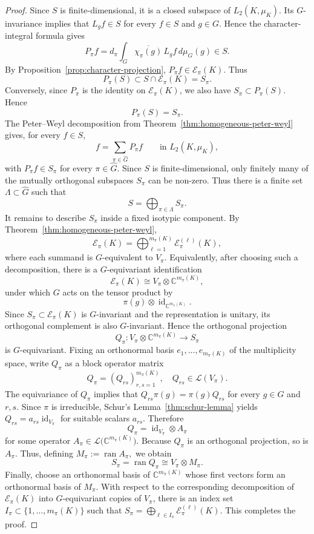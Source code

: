 \documentclass[11pt,showkeys]{amsart}
\begin{document}
\begin{proof}
Since \(S\) is finite-dimensional, it is a closed subspace of
\(L_2(K,\mu_K)\). Its \(G\)-invariance implies that
\(L_gf\in S\) for every \(f\in S\) and \(g\in G\). Hence the
character-integral formula gives
\[
        P_\pi f
        =
        d_\pi
        \int_G
        \overline{\chi_\pi(g)}\,L_g f\,d\mu_G(g)
        \in S .
\]
By Proposition~\ref{prop:character-projection}, \(P_\pi f\in
\mathcal E_\pi(K)\). Thus
\[
        P_\pi(S)\subset S\cap\mathcal E_\pi(K)=S_\pi .
\]
Conversely, since \(P_\pi\) is the identity on \(\mathcal E_\pi(K)\), we
also have \(S_\pi\subset P_\pi(S)\). Hence
\[
        P_\pi(S)=S_\pi .
\]
The Peter--Weyl decomposition  from Theorem~\ref{thm:homogeneous-peter-weyl} gives, for every \(f\in S\),
\[
    f=\sum_{\pi\in\widehat G}P_\pi f
    \qquad\text{in }L_2(K,\mu_K),
\]
with \(P_\pi f\in S_\pi\) for every \(\pi\in\widehat G\). Since \(S\)
is finite-dimensional, only finitely many of the mutually orthogonal
subspaces \(S_\pi\) can be non-zero.
Thus there is a finite set
\(\Lambda\subset\widehat G\) such that
\[
        S=
        \bigoplus_{\pi\in\Lambda}S_\pi .
\]
It remains to describe \(S_\pi\) inside a fixed isotypic component.
By Theorem~\ref{thm:homogeneous-peter-weyl},
\[
    \mathcal E_\pi(K)
    =
    \bigoplus_{\ell=1}^{m_\pi(K)}
    \mathcal E_\pi^{(\ell)}(K),
\]
where each summand is \(G\)-equivalent to \(V_\pi\). Equivalently,
after choosing such a decomposition, there is a \(G\)-equivariant
identification
\[
    \mathcal E_\pi(K)
    \cong
    V_\pi\otimes\mathbb C^{m_\pi(K)},
\]
under which \(G\) acts on the tensor product  by
\[
    \pi(g)\otimes \operatorname{id}_{\mathbb C^{m_\pi(K)}}.
\]
Since \(S_\pi\subset \mathcal E_\pi(K)\) is \(G\)-invariant and the
representation is unitary, its orthogonal complement is also
\(G\)-invariant. Hence the orthogonal projection
\[
    Q_\pi:
    V_\pi\otimes\mathbb C^{m_\pi(K)}
    \longrightarrow
    S_\pi
\]
is \(G\)-equivariant. Fixing an orthonormal basis
\(e_1,\ldots,e_{m_\pi(K)}\) of the multiplicity space, write \(Q_\pi\)
as a block operator matrix
\[
    Q_\pi=(Q_{rs})_{r,s=1}^{m_\pi(K)},
    \quad
    Q_{rs}\in\mathcal L(V_\pi).
\]
The equivariance of \(Q_\pi\) implies that
$ Q_{rs}\pi(g)=\pi(g)Q_{rs}$
    for every $g\in G$ and \(r,s\). Since \(\pi\) is irreducible,
Schur's Lemma~\ref{thm:schur-lemma} yields
\(
    Q_{rs}=a_{rs}\operatorname{id}_{V_\pi}
\)
for suitable scalars \(a_{rs}\). Therefore
\[
    Q_\pi
    =
    \operatorname{id}_{V_\pi}\otimes A_\pi
\]
for some operator
\(
    A_\pi\in
    \mathcal L\bigl(\mathbb C^{m_\pi(K)}\bigr).
\)
Because \(Q_\pi\) is an orthogonal projection, so is \(A_\pi\). Thus,
defining
\(
    M_\pi:=\operatorname{ran}A_\pi,
\)
we obtain
\[
    S_\pi
    =
    \operatorname{ran}Q_\pi
    \cong
    V_\pi\otimes M_\pi.
\]
Finally, choose an orthonormal basis of
\(\mathbb C^{m_\pi(K)}\) whose first vectors form an orthonormal basis
of \(M_\pi\). With respect to the corresponding decomposition of
\(\mathcal E_\pi(K)\) into \(G\)-equivariant copies of \(V_\pi\), there
is an index set
\(
    I_\pi\subset\{1,\ldots,m_\pi(K)\}
\)
such that
\(
    S_\pi
    =
    \bigoplus_{\ell\in I_\pi}
    \mathcal E_\pi^{(\ell)}(K).
\)
This completes the proof.
\end{proof}
\end{document}
